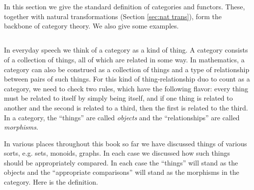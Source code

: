 \documentclass[CT4S-EN-RU]{subfiles}
\begin{document}
\section{}

\begin{blockENG}
In this section we give the standard definition of categories and functors. These, together with natural transformations (Section \ref{sec:nat trans}), form the backbone of category theory. We also give some examples.
\end{blockENG}

\begin{blockRUS}
\end{blockRUS}


\subsection{}\label{sec:categories}

\begin{blockENG}
In everyday speech we think of a category as a kind of thing. A category consists of a collection of things, all of which are related in some way. In mathematics, a category can also be construed as a collection of things and a type of relationship between pairs of such things. For this kind of thing-relationship duo to count as a category, we need to check two rules, which have the following flavor: every thing must be related to itself by simply being itself, and if one thing is related to another and the second is related to a third, then the first is related to the third. In a category, the “things” are called {\em objects} and the “relationships” are called {\em morphisms}.
\end{blockENG}

\begin{blockRUS}
\end{blockRUS}

\begin{blockENG}
In various places throughout this book so far we have discussed things of various sorts, e.g. sets, monoids, graphs. In each case we discussed how such things should be appropriately compared. In each case the “things” will stand as the objects and the “appropriate comparisons” will stand as the morphisms in the category. Here is the definition.
\end{blockENG}
\end{document}

